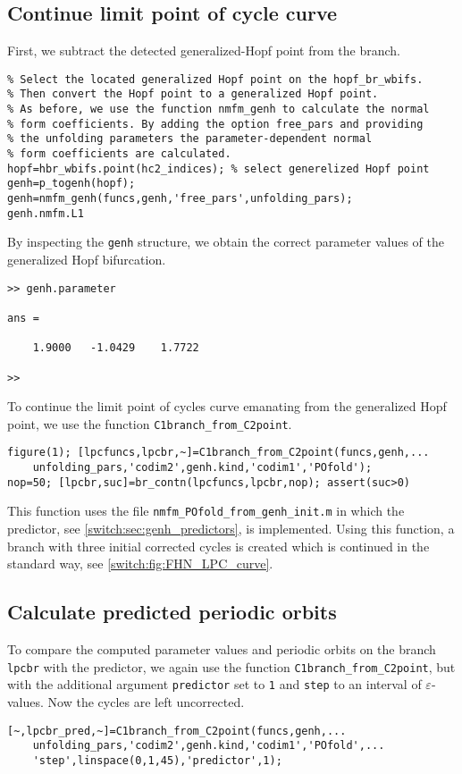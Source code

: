 %
\subsection{Continue limit point of cycle curve}
First, we subtract the detected generalized-Hopf point from the branch.
\begin{lstlisting}[style=customMatlab]
%% Calculate parameter-dependent normal form coefficients
% Select the located generalized Hopf point on the hopf_br_wbifs.
% Then convert the Hopf point to a generalized Hopf point.
% As before, we use the function nmfm_genh to calculate the normal 
% form coefficients. By adding the option free_pars and providing  
% the unfolding parameters the parameter-dependent normal  
% form coefficients are calculated.
hopf=hbr_wbifs.point(hc2_indices); % select generelized Hopf point
genh=p_togenh(hopf);
genh=nmfm_genh(funcs,genh,'free_pars',unfolding_pars);
genh.nmfm.L1
\end{lstlisting}
By inspecting the \lstinline|genh| structure, we obtain the correct parameter values of the generalized Hopf bifurcation.
\begin{lstlisting}[style=matlabConsole]
>> genh.parameter

ans =

    1.9000   -1.0429    1.7722

>> 
\end{lstlisting}
To continue the limit point of cycles curve emanating from the generalized Hopf point, we use the function \lstinline|C1branch_from_C2point|.
\begin{lstlisting}[style=customMatlab]
%% Continue LPC curve emanating from generalized-Hopf point
figure(1); [lpcfuncs,lpcbr,~]=C1branch_from_C2point(funcs,genh,...
    unfolding_pars,'codim2',genh.kind,'codim1','POfold');
nop=50; [lpcbr,suc]=br_contn(lpcfuncs,lpcbr,nop); assert(suc>0)
\end{lstlisting}
This function uses the file \lstinline|nmfm_POfold_from_genh_init.m| in which the predictor, see \cref{switch:sec:genh_predictors}, is implemented. Using this function, a branch with three initial corrected cycles is created which is continued in the standard way, see \cref{switch:fig:FHN_LPC_curve}.

\subsection{Calculate predicted periodic orbits}
To compare the computed parameter values and periodic orbits on the branch \lstinline|lpcbr| with the predictor, we again use the function \lstinline|C1branch_from_C2point|, but with the additional argument \lstinline|predictor| set to \lstinline|1| and \lstinline|step| to an interval of $\varepsilon$-values. Now the cycles are left uncorrected.
\begin{lstlisting}[style=customMatlab]
%% Predictor LPC curve emanating from generalized-Hopf point
[~,lpcbr_pred,~]=C1branch_from_C2point(funcs,genh,...
    unfolding_pars,'codim2',genh.kind,'codim1','POfold',...
    'step',linspace(0,1,45),'predictor',1);
\end{lstlisting}

